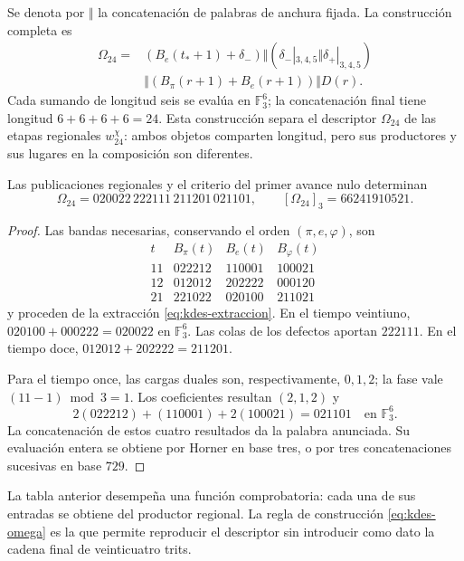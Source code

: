 Se denota por $\Vert$ la concatenación de palabras de anchura fijada.
La construcción completa es
\begin{equation}
 \begin{split}
 \Omega_{24}={}&
 (B_e(t_*+1)+\delta_-)
 \Vert (\delta_-|_{3,4,5}\Vert\delta_+|_{3,4,5})\\
 &\Vert(B_\pi(r+1)+B_e(r+1))\Vert D(r).
 \end{split}
 \label{eq:kdes-omega}
\end{equation}
Cada sumando de longitud seis se evalúa en $\mathbb F_3^6$; la
concatenación final tiene longitud $6+6+6+6=24$. Esta construcción
separa el descriptor $\Omega_{24}$ de las etapas regionales
$w_{24}^{\chi}$: ambos objetos comparten longitud, pero sus productores
y sus lugares en la composición son diferentes.

\begin{proposition}
Las publicaciones regionales y el criterio del primer avance nulo
determinan
\[
 \Omega_{24}=020022\,222111\,211201\,021101,
 \qquad [\Omega_{24}]_3=66241910521.
\]
\end{proposition}
\begin{proof}
Las bandas necesarias, conservando el orden $(\pi,e,\varphi)$, son
\[
 \begin{array}{c|ccc}
 t&B_\pi(t)&B_e(t)&B_\varphi(t)\\\hline
 11&022212&110001&100021\\
 12&012012&202222&000120\\
 21&221022&020100&211021
 \end{array}
\]
y proceden de la extracción \eqref{eq:kdes-extraccion}. En el tiempo
veintiuno,
$020100+000222=020022$ en $\mathbb F_3^6$. Las colas de los defectos
aportan $222111$. En el tiempo doce,
$012012+202222=211201$.

Para el tiempo once, las cargas duales son, respectivamente, $0,1,2$;
la fase vale $(11-1)\bmod3=1$. Los coeficientes resultan $(2,1,2)$ y
\[
 2(022212)+(110001)+2(100021)=021101
 \quad\text{en }\mathbb F_3^6.
\]
La concatenación de estos cuatro resultados da la palabra anunciada.
Su evaluación entera se obtiene por Horner en base tres, o por tres
concatenaciones sucesivas en base $729$.
\end{proof}

La tabla anterior desempeña una función comprobatoria: cada una de sus
entradas se obtiene del productor regional. La regla de construcción
\eqref{eq:kdes-omega} es la que permite reproducir el descriptor sin
introducir como dato la cadena final de veinticuatro trits.

